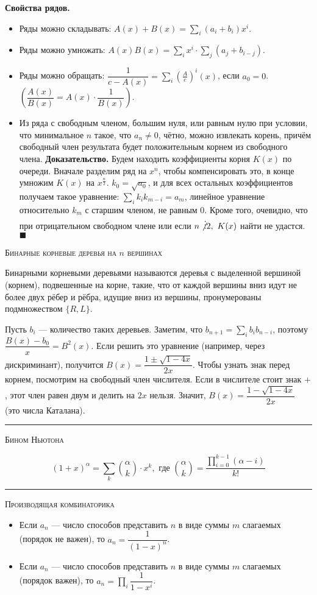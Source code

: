 \documentclass[a4paper,12pt]{article}
\newcounter{defs}
\newcommand*{\definition}{\refstepcounter{defs}{\bf Определение \arabic{defs}. }}
\newcommand*{\QEDA}{\hfill\ensuremath{\blacksquare}}
\newcommand{\proof}{{\bf Доказательство. }}
\begin{document}
{\bf Свойства рядов.}
\begin{itemize}
	\item Ряды можно складывать: $A(x)+B(x)=\sum\limits_i(a_i+b_i)x^i$.
	\item Ряды можно умножать: $A(x)B(x)=\sum\limits_i x^i\cdot\sum\limits_j(a_j+b_{i-j})$.
	\item Ряды можно обращать: $\dfrac1{c-A(x)}=\sum\limits_i (\frac Ac)^i(x)$, если $a_0=0$. $\left(\dfrac{A(x)}{B(x)}=A(x)\cdot\dfrac1{B(x)}\right)$.
	\item Из ряда с свободным членом, большим нуля, или равным нулю при условии, что минимальное $n$ такое, что $a_n\neq0$, чётно, можно извлекать корень, причём свободный член результата будет положительным корнем из свободного члена. \proof Будем находить коэффициенты корня $K(x)$ по очереди. Вначале разделим ряд на $x^n$, чтобы компенсировать это, в конце умножим $K(x)$ на $x^\frac n2$. $k_0=\sqrt{a_0}$, и для всех остальных коэффициентов получаем такое уравнение: $\sum\limits_ik_ik_{m-i}=a_m$, линейное уравнение относительно $k_m$ с старшим членом, не равным 0. Кроме того, очевидно, что при отрицательном свободном члене или если $n\not\vdots2,\ K(x)$ найти не удастся. \QEDA
\end{itemize}

\newpage
\centerline{\large\scshape Бинарные корневые деревья на $n$ вершинах}
\definition Бинарными корневыми деревьями называются деревья с выделенной вершиной (корнем), подвешенные на корне, такие, что от каждой вершины вниз идут не более двух рёбер и рёбра, идущие вниз из вершины, пронумерованы подмножеством $\{R,L\}$.

Пусть $b_i$ --- количество таких деревьев. Заметим, что $b_{n+1}=\sum\limits_i b_ib_{n-i}$, поэтому $\dfrac{B(x)-b_0}x=B^2(x)$. Если решить это уравнение (например, через дискриминант), получится $B(x)=\dfrac{1\pm\sqrt{1-4x}}{2x}$. Чтобы узнать знак перед корнем, посмотрим на свободный член числителя. Если в числителе стоит знак $+$, этот член равен двум и делить на $2x$ нельзя. Значит, $B(x)=\dfrac{1-\sqrt{1-4x}}{2x}$ (это числа Каталана).

\vskip20pt\hrule\vskip8pt
\centerline{\large\scshape Бином Ньютона}
\[
	(1+x)^\alpha=\sum\limits_k\binom\alpha k\cdot x^k,
	\text{ где }\binom\alpha k=\dfrac{\prod\limits_{i=0}^{k-1}(\alpha-i)}{k!}
\]

\vskip20pt\hrule\vskip8pt
\centerline{\large\scshape Производящая комбинаторика}
\begin{itemize}
	\item Если $a_n$ --- число способов представить $n$ в виде суммы $m$ слагаемых (порядок не важен), то $a_n=\dfrac1{(1-x)^n}$.
	\item Если $a_n$ --- число способов представить $n$ в виде суммы $m$ слагаемых (порядок важен), то $a_n=\prod\limits_i\dfrac1{1-x^i}$.
\end{itemize}
\end{document}
